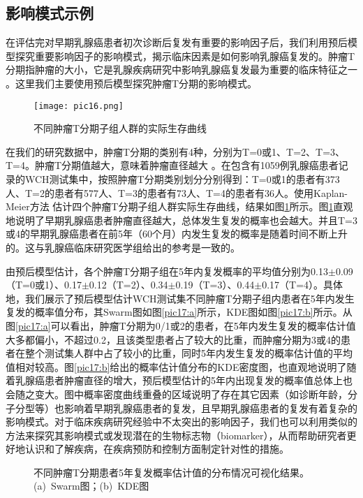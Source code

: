 \subsection{影响模式示例}

在评估完对早期乳腺癌患者初次诊断后复发有重要的影响因子后，我们利用预后模型探究重要影响因子的影响模式，揭示临床因素是如何影响乳腺癌复发的。肿瘤T分期指肿瘤的大小，它是乳腺疾病研究中影响乳腺癌复发最为重要的临床特征之一 。这里我们主要使用预后模型探究肿瘤T分期的影响模式。

\begin{figure}[H]
\texttt{[image: pic16.png]}
\caption{不同肿瘤T分期子组人群的实际生存曲线}
\label{pic16}
\end{figure}

在我们的研究数据中，肿瘤T分期的类别有4种，分别为T=0或1、T=2、T=3、T=4。肿瘤T分期值越大，意味着肿瘤直径越大 。在包含有1059例乳腺癌患者记录的WCH测试集中，按照肿瘤T分期类别划分分别得到：T=0或1的患者有373人、T=2的患者有577人、T=3的患者有73人、T=4的患者有36人。使用Kaplan-Meier方法 估计四个肿瘤T分期子组人群实际生存曲线，结果如图\ref{pic16}所示。图\ref{pic16}直观地说明了早期乳腺癌患者肿瘤直径越大，总体发生复发的概率也会越大。并且T=3或4的早期乳腺癌患者在前5年（60个月）内发生复发的概率是随着时间不断上升的。这与乳腺癌临床研究医学组给出的参考是一致的。

由预后模型估计，各个肿瘤T分期子组在5年内复发概率的平均值分别为0.13$\pm$0.09（T=0或1）、0.17$\pm$0.12（T=2）、0.34$\pm$0.19（T=3）、0.44$\pm$0.17（T=4）。具体地，我们展示了预后模型估计WCH测试集不同肿瘤T分期子组内患者在5年内发生复发的概率值分布，其Swarm图如图\ref{pic17:a}所示，KDE图如图\ref{pic17:b}所示。从图\ref{pic17:a}可以看出，肿瘤T分期为0/1或2的患者，在5年内发生复发的概率估计值大多都偏小，不超过0.2，且该类型患者占了较大的比重，而肿瘤分期为3或4的患者在整个测试集人群中占了较小的比重，同时5年内发生复发的概率估计值的平均值相对较高。图\ref{pic17:b}给出的概率估计值分布的KDE密度图，也直观地说明了随着乳腺癌患者肿瘤直径的增大，预后模型估计的5年内出现复发的概率值总体上也会随之变大。图中概率密度曲线重叠的区域说明了存在其它因素（如诊断年龄，分子分型等）也影响着早期乳腺癌患者的复发，且早期乳腺癌患者的复发有着复杂的影响模式。对于临床疾病研究经验中不太突出的影响因子，我们也可以利用类似的方法来探究其影响模式或发现潜在的生物标志物（biomarker），从而帮助研究者更好地认识和了解疾病，在疾病预防和控制方面制定针对性的措施。

\begin{figure}[h]
\centering 
{}
\hspace{0.01\linewidth}
\caption{不同肿瘤T分期患者5年复发概率估计值的分布情况可视化结果。(a)\ Swarm图；(b)\ KDE图}
\label{pic17}
\end{figure}

